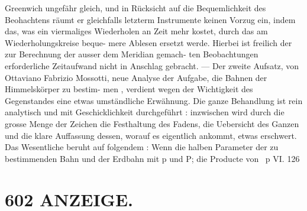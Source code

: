 \documentclass[12pt,a4paper]{article}
\begin{document}
Greenwich  ungefähr  gleich,  und  in  Rücksicht  auf  die Bequemlichkeit  des  Beohachtens  räumt  er  gleichfalls  letzterm  Instrumente  keinen  Vorzug  ein,  indem das,  was  ein  viermaliges  Wiederholen  an  Zeit  mehr  kostet,  durch  das  am  Wiederholungskreise  beque- mere Ablesen  ersetzt  werde.  Hierbei  ist  freilich  der  zur  Berechnung  der  ausser  dem  Meridian  gemach- ten Beobachtungen  erforderliche  Zeitaufwand  nicht  in  Anschlag  gebracht.  ---  Der  zweite  Aufsatz,  von Ottaviano  Fabrizio  Mossotti,  neue  Analyse  der  Aufgabe,  die  Bahnen  der  Himmelskörper  zu  bestim- men ,  verdient  wegen  der  Wichtigkeit  des  Gegenstandes  eine  etwas  umständliche  Erwähnung.  Die  ganze Behandlung  ist  rein  analytisch  und  mit  Geschicklichkeit  durchgeführt :  inzwischen  wird  durch  die  grosse Menge  der  Zeichen  die  Festhaltung  des  Fadens,  die  Uebersicht  des  Ganzen  und  die  klare  Auffassung dessen,  worauf  es  eigentlich  ankommt,  etwas  erschwert.  Das  Wesentliche  beruht  auf  folgendem :  Wenn die  halben  Parameter  der  zu  bestimmenden  Bahn  und  der  Erdbahn  mit  p  und  P;  die  Producte  von  \  p VI.  126


\section*{602  ANZEIGE.}
\end{document}
